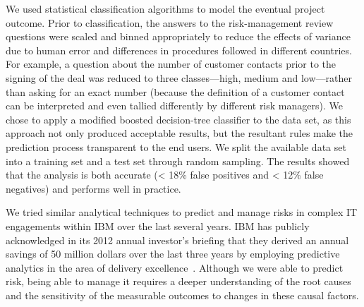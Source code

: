 We used statistical classification algorithms to model the eventual project
outcome. Prior to classification, the answers to the risk-management review
questions were scaled and binned appropriately to reduce the effects of variance
due to human error and differences in procedures followed in different
countries. For example, a question about the number of customer contacts prior
to the signing of the deal was reduced to three classes---high, medium and
low---rather than asking for an exact number (because the definition of a
customer contact can be interpreted and even tallied differently by different
risk managers). We chose to apply a modified boosted decision-tree classifier to
the data set, as this approach not only produced acceptable results, but the
resultant rules make the prediction process transparent to the end users. We
split the available data set into a training set and a test set through random
sampling. The results showed that the analysis is both accurate (< 18\% false
positives and < 12\% false negatives) and performs well in practice.

We tried similar analytical techniques to predict and manage risks in complex IT
engagements within IBM over the last several years. IBM has publicly
acknowledged in its 2012 annual investor's briefing that they derived an annual
savings of 50 million dollars over the last three years by employing predictive
analytics in the area of delivery
excellence~\cite{ibm-investors-briefing}. Although we were able to predict risk,
being able to manage it requires a deeper understanding of the root causes and
the sensitivity of the measurable outcomes to changes in these causal factors.
